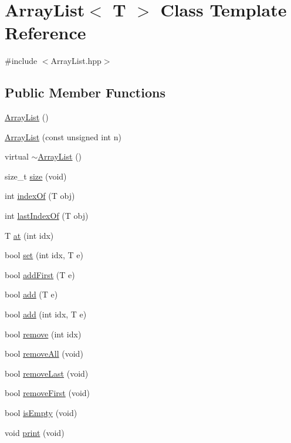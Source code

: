 \hypertarget{class_array_list}{}\section{Array\+List$<$ T $>$ Class Template Reference}
\label{class_array_list}


{\ttfamily \#include $<$Array\+List.\+hpp$>$}

\subsection*{Public Member Functions}
\begin{DoxyCompactItemize}
\item 
\hyperlink{class_array_list_a77ba51ae82bb2246563af5c4d64d438e}{Array\+List} ()
\item 
\hyperlink{class_array_list_a89b4c5051ae22e38927da22da6d8dcce}{Array\+List} (const unsigned int n)
\item 
virtual \hyperlink{class_array_list_a4af637822f64b61267b1e0ed4d4fca33}{$\sim$\+Array\+List} ()
\item 
size\+\_\+t \hyperlink{class_array_list_a0022a453da89f2e5de3e6a50e5b40991}{size} (void)
\item 
int \hyperlink{class_array_list_a486bf36769c5e760f84d65240d146a48}{index\+Of} (T obj)
\item 
int \hyperlink{class_array_list_a0e94b0cadf1bb468ce7fb1bc54a4bf51}{last\+Index\+Of} (T obj)
\item 
T \hyperlink{class_array_list_a34a20d9a091492976328f850dc5181be}{at} (int idx)
\item 
bool \hyperlink{class_array_list_ad1cb8be40adb8473fb90e8d03f6316d9}{set} (int idx, T e)
\item 
bool \hyperlink{class_array_list_aad86b66c27bd25a19cb2420a4af3670d}{add\+First} (T e)
\item 
bool \hyperlink{class_array_list_a88824179302e44e7754033bc6728f259}{add} (T e)
\item 
bool \hyperlink{class_array_list_a7fe882f0cd622347b4366ef50cfc4159}{add} (int idx, T e)
\item 
bool \hyperlink{class_array_list_aaad5499ce488dbc92350547d449581a8}{remove} (int idx)
\item 
bool \hyperlink{class_array_list_a7e51b6676aaa19cf530e1707d27dfd1f}{remove\+All} (void)
\item 
bool \hyperlink{class_array_list_aca8e026cfab4748526860c0bd2fafac0}{remove\+Last} (void)
\item 
bool \hyperlink{class_array_list_a04be6b9b56212c867b22ca23a9c4e4ab}{remove\+First} (void)
\item 
bool \hyperlink{class_array_list_abff6fb91622740059536d60d00da069d}{is\+Empty} (void)
\item 
void \hyperlink{class_array_list_a283c138a1e6f6ab56f042d117d69ba46}{print} (void)
\end{DoxyCompactItemize}
